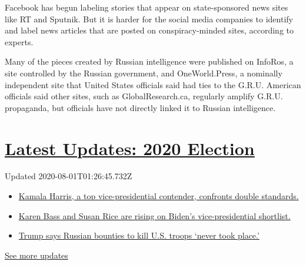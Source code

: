 Facebook has begun labeling stories that appear on state-sponsored news
sites like RT and Sputnik. But it is harder for the social media
companies to identify and label news articles that are posted on
conspiracy-minded sites, according to experts.

Many of the pieces created by Russian intelligence were published on
InfoRos, a site controlled by the Russian government, and
OneWorld.Press, a nominally independent site that United States
officials said had ties to the G.R.U. American officials said other
sites, such as GlobalResearch.ca, regularly amplify G.R.U. propaganda,
but officials have not directly linked it to Russian intelligence.

\hypertarget{latest-updates-2020-election}{%
\section{\texorpdfstring{\href{https://www.nytimes.com/2020/07/31/us/elections/biden-vs-trump.html?action=click\&pgtype=Article\&state=default\&region=MAIN_CONTENT_1\&context=storylines_live_updates}{Latest
Updates: 2020
Election}}{Latest Updates: 2020 Election}}\label{latest-updates-2020-election}}

Updated 2020-08-01T01:26:45.732Z

\begin{itemize}
\tightlist
\item
  \href{https://www.nytimes.com/2020/07/31/us/elections/biden-vs-trump.html?action=click\&pgtype=Article\&state=default\&region=MAIN_CONTENT_1\&context=storylines_live_updates\#link-29fdff45}{Kamala
  Harris, a top vice-presidential contender, confronts double
  standards.}
\item
  \href{https://www.nytimes.com/2020/07/31/us/elections/biden-vs-trump.html?action=click\&pgtype=Article\&state=default\&region=MAIN_CONTENT_1\&context=storylines_live_updates\#link-13ec3d9c}{Karen
  Bass and Susan Rice are rising on Biden's vice-presidential
  shortlist.}
\item
  \href{https://www.nytimes.com/2020/07/31/us/elections/biden-vs-trump.html?action=click\&pgtype=Article\&state=default\&region=MAIN_CONTENT_1\&context=storylines_live_updates\#link-49e9a016}{Trump
  says Russian bounties to kill U.S. troops `never took place.'}
\end{itemize}

\href{https://www.nytimes.com/2020/07/31/us/elections/biden-vs-trump.html?action=click\&pgtype=Article\&state=default\&region=MAIN_CONTENT_1\&context=storylines_live_updates}{See
more updates}

